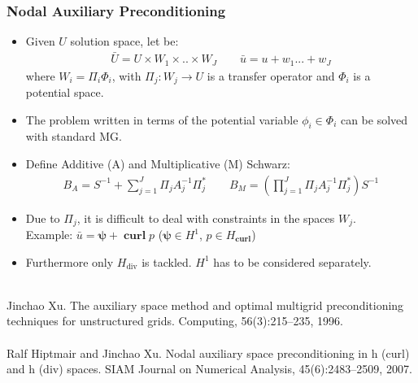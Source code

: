 \documentclass[8pt, oneside]{beamer}   	%
\newcommand{\bcurl}{\operatorname{\textbf{curl}}}
\newcommand{\bpsi}{\boldsymbol{\psi}}
\begin{document}
\begin{frame}
\frametitle{\textbf{Nodal Auxiliary Preconditioning}}
\begin{itemize}
\item Given $U$ solution space, let be: 
\begin{align*}
\bar{U}=U \times W_1 \times.. \times W_J \qquad \bar{u}=u + w_1 ...+w_J
\end{align*}
where $W_i=\Pi_i  \Phi_i $, with $ \Pi_j: W_j \to {U}$ is a transfer operator and $\Phi_i $ is a potential space.
\item The problem written in terms of the potential variable $\phi_i \in \Phi_i$ can be solved with standard MG.
\item Define Additive (A) and Multiplicative (M) Schwarz:
\begin{align*}
B_A=S^{-1}+\sum_{j=1}^J \Pi_j A_j^{-1} \Pi_j^* \qquad B_M=(\prod_{j=1}^J \Pi_j A_j^{-1}\Pi_j^* )S^{-1}
\end{align*}
\item Due to $\Pi_j$, it is difficult to deal with constraints in the spaces $W_j$.\\
Example: $\bar{u}=\bpsi + \bcurl p$ ($\bpsi  \in H^1$, $p \in H_{\bcurl}$)
\item Furthermore only $H_{\text{div}}$ is tackled. $H^1$ has to be considered separately.  
\end{itemize}

${}$\\
\footnotesize{Jinchao Xu. The auxiliary space method and optimal multigrid preconditioning techniques for unstructured grids. Computing, 56(3):215–235, 1996.}
${}$\\
${}$\\
\footnotesize{Ralf Hiptmair and Jinchao Xu. Nodal auxiliary space preconditioning in h (curl) and h (div) spaces. SIAM Journal on Numerical Analysis, 45(6):2483–2509, 2007.}
\end{frame}
\end{document}
